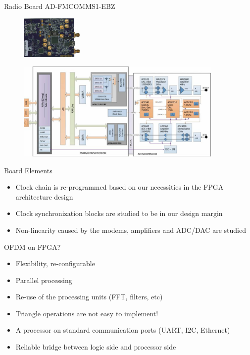 \documentclass{beamer}
\begin{document}
\begin{frame}{Radio Board} {AD-FMCOMMS1-EBZ}
\begin{figure}
\centering
\includegraphics[width=3cm]{content/fig/fmcomms1.jpg}
\end{figure}

\begin{figure}
\centering
\includegraphics[width=10cm]{content/fig/fmcomms1Blockdiagram.jpg}
\end{figure}
\end{frame}

\begin{frame}{Board Elements}
  \begin{itemize}
   
  \item {
Clock chain is re-programmed based on our necessities in the FPGA architecture design
  }
  
  \item {  
Clock synchronization blocks are studied to be in our design margin
  }
  
  \item {  
Non-linearity caused by the modems, amplifiers and ADC/DAC are studied 
  }
  
   \end{itemize}
\end{frame}

\begin{frame}{OFDM on FPGA?}
  \begin{itemize}
   
  \item {
Flexibility, re-configurable
  }
  
  \item {  
Parallel processing
  }

  \item {  
Re-use of the processing units (FFT, filters, etc)
  }
  
  \item {  
Triangle operations are not easy to implement!
  }
  
  \item {  
A processor on standard communication ports (UART, I2C, Ethernet) 
  }
  
    \item {  
Reliable bridge between logic side and processor side 
  }
  
   \end{itemize}
\end{frame}
\end{document}
